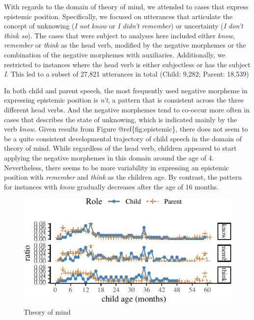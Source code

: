 \documentclass[10pt, letterpaper]{article}
\newenvironment{CodeChunk}{}{}
\begin{document}
With regards to the domain of theory of mind, we attended to cases that
express epistemic position. Specifically, we focused on utterances that
articulate the concept of unknowing (\emph{I not know} or \emph{I didn't
remember}) or uncertainty (\emph{I don't think so}). The cases that were
subject to analyses here included either \emph{know}, \emph{remember} or
\emph{think} as the head verb, modified by the negative morphemes or the
combination of the negative morphemes with auxiliaries. Additionally, we
restricted to instances where the head verb is either subjectless or has
the subject \emph{I}. This led to a subset of 27,821 utterances in total
(Child: 9,282; Parent: 18,539)

In both child and parent speech, the most frequently used negative
morpheme in expressing epistemic position is \emph{n't}, a pattern that
is consistent across the three different head verbs. And the negative
morphemes tend to co-occur more often in cases that describes the state
of unknowing, which is indicated mainly by the verb \emph{know}. Given
results from Figure @ref\{fig:epistemic\}, there does not seem to be a
quite consistent developmental trajectory of child speech in the domain
of theory of mind. While regardless of the head verb, children appeared
to start applying the negative morphemes in this domain around the age
of 4. Nevertheless, there seems to be more variability in expressing an
epistemic position with \emph{remember} and \emph{think} as the children
age. By contrast, the pattern for instances with \emph{know} gradually
decreases after the age of 16 months.

\begin{CodeChunk}
\begin{figure}[H]

{\centering \includegraphics{figs/epistemic-1} 

}

\caption[Theory of mind]{Theory of mind}\label{fig:epistemic}
\end{figure}
\end{CodeChunk}
\end{document}
